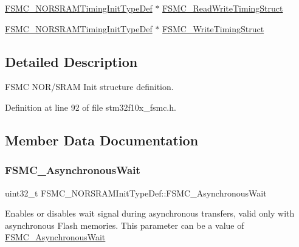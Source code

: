 \begin{DoxyCompactItemize}
\item 
\hyperlink{struct_f_s_m_c___n_o_r_s_r_a_m_timing_init_type_def}{F\+S\+M\+C\+\_\+\+N\+O\+R\+S\+R\+A\+M\+Timing\+Init\+Type\+Def} $\ast$ \hyperlink{struct_f_s_m_c___n_o_r_s_r_a_m_init_type_def_a33f8e281b9ff3187906309d005b4159e}{F\+S\+M\+C\+\_\+\+Read\+Write\+Timing\+Struct}
\item 
\hyperlink{struct_f_s_m_c___n_o_r_s_r_a_m_timing_init_type_def}{F\+S\+M\+C\+\_\+\+N\+O\+R\+S\+R\+A\+M\+Timing\+Init\+Type\+Def} $\ast$ \hyperlink{struct_f_s_m_c___n_o_r_s_r_a_m_init_type_def_ac62cf7426a933ce6aa6efc3a8e82dac1}{F\+S\+M\+C\+\_\+\+Write\+Timing\+Struct}
\end{DoxyCompactItemize}


\subsection{Detailed Description}
F\+S\+MC N\+O\+R/\+S\+R\+AM Init structure definition. 

Definition at line 92 of file stm32f10x\+\_\+fsmc.\+h.



\subsection{Member Data Documentation}
\mbox{\label{struct_f_s_m_c___n_o_r_s_r_a_m_init_type_def_ac350cc34377fe3d5f882a6801bab1ac9}} 
\subsubsection{\texorpdfstring{F\+S\+M\+C\+\_\+\+Asynchronous\+Wait}{FSMC\_AsynchronousWait}}
{\footnotesize\ttfamily uint32\+\_\+t F\+S\+M\+C\+\_\+\+N\+O\+R\+S\+R\+A\+M\+Init\+Type\+Def\+::\+F\+S\+M\+C\+\_\+\+Asynchronous\+Wait}

Enables or disables wait signal during asynchronous transfers, valid only with asynchronous Flash memories. This parameter can be a value of \hyperlink{group___f_s_m_c___asynchronous_wait}{F\+S\+M\+C\+\_\+\+Asynchronous\+Wait} 

